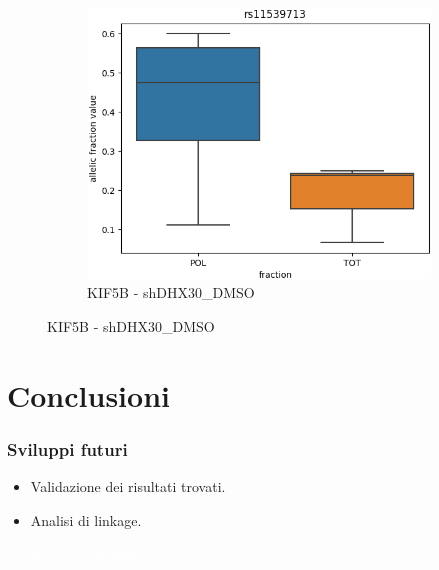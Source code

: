 \documentclass[aspectration=1610]{beamer}
\DeclareRobustCommand{\#}{\adjustbox{valign=B,totalheight=.57\baselineskip}{\oldhash}}
\begin{document}
\begin{frame}
\begin{figure}
\begin{subfigure}{0.33\textwidth}
			 	\caption{KIF5B - shDHX30\_DMSO}
			 	\includegraphics[width=\textwidth]{media/shDHX30_DMSO_rs11539713.png}
			 \end{subfigure}
			\end{figure}
		 \end{frame}
	\section{Conclusioni}
	\begin{frame}
		\frametitle{Sviluppi futuri}
		\begin{itemize}
			\item Validazione dei risultati trovati.
			\item Analisi di linkage.
		\end{itemize}
	\end{frame}
	\begin{frame}
		\Huge{\textcolor{white}{Grazie per l'attenzione.}}
	\end{frame}
\end{document}
